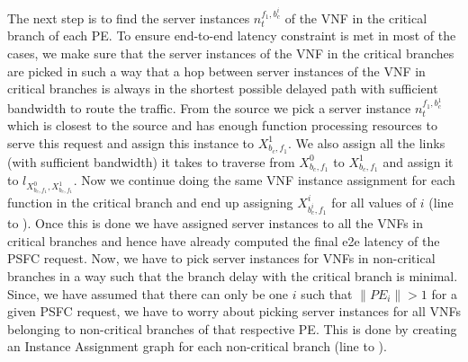 \documentclass[journal]{IEEEtran}
\begin{document}
The next step is to find the server instances $n_{t}^{f_{1},b_{c}^{i}}$ of the VNF in the critical branch of each PE. To ensure end-to-end latency constraint is met in most of the cases, we make sure that the server instances of the VNF in the critical branches are picked in such a way that a hop between server instances of the VNF in critical branches is always in the shortest possible delayed path with sufficient bandwidth to route the traffic. From the source we pick a server instance $n_{t}^{f_{1},b_{c}^{1}}$ which is closest to the source and has enough function processing resources to serve this request and assign this instance to $X_{b_{c}, f_{1}}^{1}$. We also assign all the links (with sufficient bandwidth) it takes to traverse from $X_{b_{c}, f_{1}}^{0}$ to $X_{b_{c}, f_{1}}^{1}$ and assign it to $l_{X_{b_{c}, f_{1}}^{0}, X_{b_{c}, f_{1}}^{1}}$. Now we continue doing the same VNF instance assignment for each function in the critical branch and end up assigning $X_{b_{c}^{i}, f_{1}}^{i}$ for all values of $i$ (line to ). Once this is done we have assigned server instances to all the VNFs in critical branches and hence have already computed the final e2e latency of the PSFC request. Now, we have to pick server instances for VNFs in non-critical branches in a way such that the branch delay with the critical branch is minimal. Since, we have assumed that there can only be one $i$ such that  $\lVert PE_i \rVert > 1$ for a given PSFC request, we have to worry about picking server instances for all VNFs belonging to non-critical branches of that respective PE. This is done by creating an Instance Assignment graph for each non-critical branch (line to ).
\end{document}
